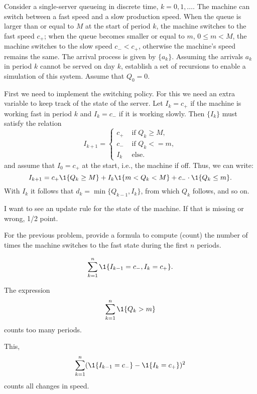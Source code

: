 \begin{exercise}[201706]
Consider a single-server queueing  in discrete time, $k=0,1,\ldots$. The machine can switch between a fast speed and a slow production speed. When the queue is larger than or equal to $M$ at the start of period $k$, the machine switches to the fast speed $c_+$; when the queue becomes smaller or equal to $m$, $0\leq m<M$, the machine switches to the slow speed $c_- < c_+$, otherwise the machine's speed remains the same. The arrival process is given by $\{a_k\}$. Assuming the arrivals $a_k$ in period $k$ cannot be served on day $k$, establish a set of recursions to enable a simulation of this system. Assume that $Q_0=0$.
\begin{solution}
    First we need to implement the switching policy. For this we need an extra
    variable to keep track of the state of the server. Let $I_k=c_+$ if the machine is working fast in period $k$ and $I_k=c_-$ if it is working slowly. Then $\{I_k\}$ must satisfy the relation
    \begin{equation*}
      I_{k+1} =
      \begin{cases}
        c_+ & \text{ if } Q_{k} \geq M,\\
        c_- & \text{ if }  Q_{k} <= m,\\
        I_k & \text{ else. }
      \end{cases}
    \end{equation*}
and assume that $I_0 =c_+$ at the start, i.e., the machine if off. Thus, we can write:
\begin{equation*}
  I_{k+1} = c_+ \1{Q_k\geq M} + I_k \1{m<Q_k<M} + c_-\cdot \1{Q_k \leq m}.
\end{equation*}
With $I_k$ it follows that $d_k =\min\{Q_{k-1}, I_k \}$, from which
$Q_k$ follows, and so on.

I want to see an update rule for the state of the machine. If that is missing or wrong, 1/2 point.
\end{solution}
\end{exercise}


\begin{exercise}[201706] 
For the previous problem, provide a formula to compute (count) the number of times the machine switches to the fast state during the first $n$ periods. 
\begin{solution}
\begin{equation*}
  \sum_{k=1}^n \1{I_{k-1}=c_- ,\/ I_k = c_+}.
\end{equation*}

The expression 
\begin{equation*}
  \sum_{k=1}^n \1{Q_k > m} 
\end{equation*}
counts too many periods.

This,
\begin{equation*}
  \sum_{k=1}^n (\1{I_{k-1}=c_-} - \1{I_k = c_+})^2
\end{equation*}
counts all changes in speed.

\end{solution}
\end{exercise}

